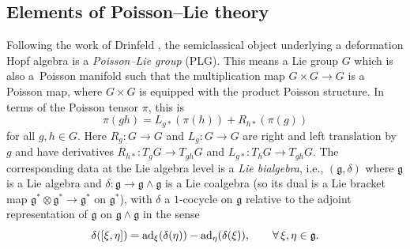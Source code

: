 \documentclass[pdftex]{sigma}
\numberwithin{equation}{section}
\newcommand{\<}{{\langle}}
\renewcommand{\>}{{\rangle}}
\newcommand{\tens}{\otimes}
\begin{document}
\subsection{Elements of Poisson--Lie theory}\label{PLGprelim}

Following the work of Drinfeld \cite{Drinfeld}, the semiclassical object underlying a deformation Hopf algebra is a {\em Poisson--Lie group} (PLG). This means a Lie group $G$ which is also a~Poisson manifold such that the multiplication map $G\times G\rightarrow G$ is a Poisson map, where $G\times G$ is equipped with the product Poisson structure. In terms of the Poisson tensor $\pi$, this is
\[ \pi(gh)=L_{g*}(\pi(h))+R_{h*}(\pi(g))\]
for all $g,h\in G$. Here $R_g\colon G\to G$ and $L_g\colon G\to G$ are right and left translation by $g$ and have derivatives $R_{h*}\colon T_gG\to T_{gh}G$ and $L_{g*}\colon T_hG\to T_{gh}G$. The corresponding data at the Lie algebra level is a {\em Lie bialgebra}, i.e., $(\mathfrak{g},\delta)$ where $\mathfrak{g}$ is a Lie algebra and $\delta\colon \mathfrak{g}\rightarrow\mathfrak{g}\wedge\mathfrak{g}$ is a Lie coalgebra (so its dual is a Lie bracket map $\mathfrak{g}^*\tens\mathfrak{g}^*\rightarrow\mathfrak{g}^*$ on $\mathfrak{g}^*$), with $\delta$ a $1$-cocycle on $\mathfrak{g}$ relative to the adjoint representation of $\mathfrak{g}$ on $\mathfrak{g}\wedge\mathfrak{g}$ in the sense
\[\delta([\xi,\eta])=\rm{ad}_{\xi}(\delta(\eta))-\rm{ad}_{\eta}(\delta(\xi)),\qquad \forall\, \xi,\eta\in\mathfrak{g}. \]
\end{document}
